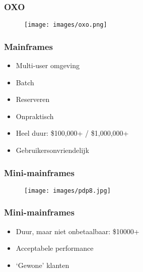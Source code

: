 \documentclass[aspectratio=43]{uva-inf-presentation}
\begin{document}

\begin{frame}
\frametitle{OXO}

\begin{figure}
\texttt{[image: images/oxo.png]}
\end{figure}

\end{frame}




\begin{frame}
\frametitle{Mainframes}

\begin{itemize}
\item Multi-user omgeving
\item Batch
\item Reserveren
\item Onpraktisch
\item Heel duur: \$100,000+ / \$1,000,000+
\item Gebruikersonvriendelijk
\end{itemize}

\end{frame}


\begin{frame}
\frametitle{Mini-mainframes}

\begin{figure}
\texttt{[image: images/pdp8.jpg]}
\end{figure}

\end{frame}


\begin{frame}
\frametitle{Mini-mainframes}

\begin{itemize}
\item Duur, maar niet onbetaalbaar: \$10000+
\item Acceptabele performance
\item `Gewone' klanten
\end{itemize}

\end{frame}
\end{document}

